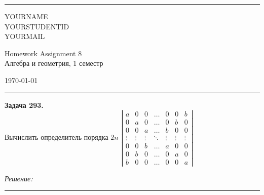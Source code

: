 \documentclass[a4paper, 12pt]{article}
\newenvironment{problem}[2][Задача]
    { \begin{mdframed}[backgroundcolor=gray!10] \textbf{#1 #2.} \\}
    {  \end{mdframed}}
\newenvironment{solution}
    {\textit{Решение: }}
    {\noindent\rule{7in}{1.5pt}}
\begin{document}

\fancyhead[C]{}
\hrule \medskip %
\begin{minipage}{0.295\textwidth} 
\raggedright\footnotesize
YOURNAME \hfill\\   
YOURSTUDENTID \hfill\\
YOURMAIL
\end{minipage}
\begin{minipage}{0.4\textwidth} 
\centering\large 
Homework Assignment 8\\ 
\normalsize 
Алгебра и геометрия, 1 семестр\\ 
\end{minipage}
\begin{minipage}{0.295\textwidth} 
\raggedleft
\today\hfill\\
\end{minipage}
\medskip\hrule 
\bigskip




\begin{problem}{293}
Вычислить определитель порядка $2n$
$\left| \begin{array}{rrrrrrr}a & 0 & 0 & \ldots & 0 & 0 & b\\ 0 & a & 0 & \ldots & 0 & b & 0 \\ 0 & 0 & a & \ldots & b & 0 & 0 \\ \vdots & \vdots & \vdots & \ddots & \vdots & \vdots & \vdots \\ 0 & 0 & b & \ldots & a & 0 & 0 \\ 0 & b & 0 & \ldots & 0 & a & 0 \\ b & 0 & 0 & \ldots & 0 & 0 & a \end{array} \right|$
\end{problem}
\begin{solution}



\end{solution} 
\end{document}

